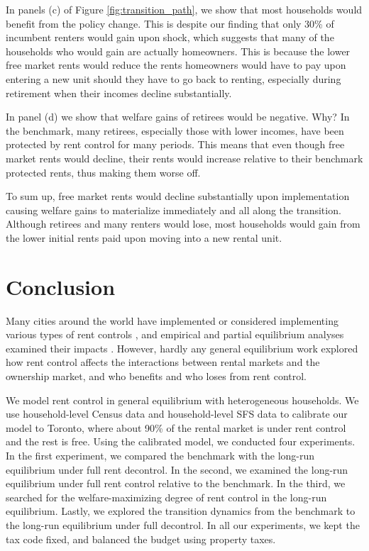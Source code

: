 \documentclass[parskip=full]{article}
\begin{document}
In panels (c) of Figure \ref{fig:transition_path}, we show that most households would benefit from the policy change. This is despite our finding that only 30\% of incumbent renters would gain upon shock, which suggests that many of the households who would gain are actually homeowners. This is because the lower free market rents would reduce the rents homeowners would have to pay upon entering a new unit should they have to go back to renting, especially during retirement when their incomes decline substantially.

In panel (d) we show that welfare gains of retirees would be negative. Why? In the benchmark, many retirees, especially those with lower incomes, have been protected by rent control for many periods. This means that even though free market rents would decline, their rents would increase relative to their benchmark protected rents, thus making them worse off.

To sum up, free market rents would decline substantially upon implementation causing welfare gains to materialize immediately and all along the transition. Although retirees and many renters would lose, most households would gain from the lower initial rents paid upon moving into a new rental unit.

\section{Conclusion}\label{sec:conclusion}

Many cities around the world have implemented or considered implementing various types of rent controls \citep{fraser-1981}, and empirical and partial equilibrium analyses examined their impacts \citep{hayek-1929,fs-1946,fallis-1985,diamond-2019}. However, hardly any general equilibrium work explored how rent control affects the interactions between rental markets and the ownership market, and who benefits and who loses from rent control. 

We model rent control in general equilibrium with heterogeneous households. We use household-level Census data and household-level SFS data to calibrate our model to Toronto, where about 90\% of the rental market is under rent control and the rest is free. Using the calibrated model, we conducted four experiments. In the first experiment, we compared the benchmark with the long-run equilibrium under full rent decontrol. In the second, we examined the long-run equilibrium under full rent control relative to the benchmark. In the third, we searched for the welfare-maximizing degree of rent control in the long-run equilibrium. Lastly, we explored the transition dynamics from the benchmark to the long-run equilibrium under full decontrol. In all our experiments, we kept the tax code fixed, and balanced the budget using property taxes.
\end{document}
